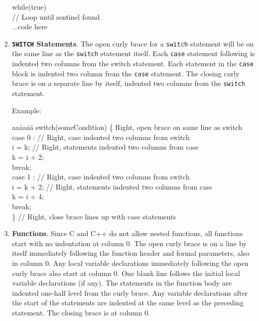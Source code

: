 \documentclass[11pt]{article}
\begin{document}
\begin{enumerate}
\begin{tt}
while(true) \\
  { // Loop until sentinel found\\
    ...code here \\
  }
\end{tt}

\item {\bf {\tt SWITCH} Statements}.
The open curly brace for a {\tt switch} statement will be on the same
line as the {\tt switch} statement itself.  Each {\tt case} statement
following is indented two columns from the switch statement.  Each
statement in the {\tt case} block is indented two column from the
{\tt case} statement.  The closing curly brace is on a separate line
by itself, indented two columns from the {\tt switch} statement.

Example:

\begin{tt}
\begin{tabbing}
aa\=aa\=aa\= \kill
switch(someCondition) \{ Right, open brace on same line as switch\\
\>case 0 : // Right, case indented two columns from switch\\
\>\>i = k; // Right, statements indented two columns from case \\
\>\>k = i + 2;\\
\>\>break;\\
\>case 1 : // Right, case indented two columns from switch\\
\>\>i = k + 2; // Right, statements indented two columns from case \\
\>\>k = i + 4;\\
\>\>break;\\
\>\}       // Right, close brace lines up with case statements
\end{tabbing}
\end{tt}

\item {\bf Functions}.  Since C and C++ do not allow nested functions,
all functions start with no indentation at column 0.  The open curly
brace is on a line by itself immediately following the function header
and formal parameters, also in column 0.  Any local variable declarations
immediately following the open curly brace also start at column 0.
One blank line follows the initial local variable declarations (if any).
The statements in the function body are indented one-half  level 
from the curly brace.  Any variable declarations after the start of the
statements are indented at the same level as the preceding statement.
The closing brace is at column 0.


\end{enumerate}
\end{document}
